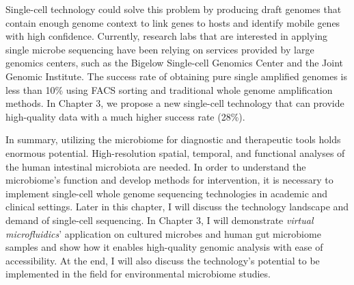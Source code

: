 Single-cell technology could solve this problem by producing draft genomes that contain enough genome context to link genes to hosts and identify mobile genes with high confidence. Currently, research labs that are interested in applying single microbe sequencing have been relying on services provided by large genomics centers, such as the Bigelow Single-cell Genomics Center and the Joint Genomic Institute. The success rate of obtaining pure single amplified genomes is less than 10\% using FACS sorting and traditional whole genome amplification methods. In Chapter 3, we propose a new single-cell technology that can provide high-quality data with a much higher success rate (28\%). 

In summary, utilizing the microbiome for diagnostic and therapeutic tools holds enormous potential. High-resolution spatial, temporal, and functional analyses of the human intestinal microbiota are needed. In order to understand the microbiome's function and develop methods for intervention, it is necessary to implement single-cell whole genome sequencing technologies in academic and clinical settings. Later in this chapter, I will discuss the technology landscape and demand of single-cell sequencing. In Chapter 3, I will demonstrate \textit{virtual microfluidics}' application on cultured microbes and human gut microbiome samples and show how it enables high-quality genomic analysis with ease of accessibility. At the end, I will also discuss the technology's potential to be implemented in the field for environmental microbiome studies. 

